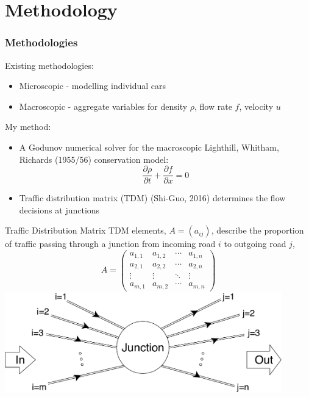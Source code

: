 \documentclass[12pt]{beamer}
\begin{document}
\section{Methodology}
	\begin{frame}
		\frametitle{Methodologies}
		Existing methodologies:
		\begin{itemize}
		    \item Microscopic - modelling individual cars
		    \item Macroscopic - aggregate variables for density $\rho$, flow rate $f$, velocity $u$
		\end{itemize}
		\vspace{0.5cm}
		My method:
		\begin{itemize}
			\item A Godunov numerical solver for the macroscopic Lighthill, Whitham, Richards (1955/56) conservation model: $$\frac{\partial\rho}{\partial t}+\frac{\partial f}{\partial x}=0$$
			\item Traffic distribution matrix (TDM) (Shi-Guo, 2016) determines the flow decisions at junctions
		\end{itemize}
	\end{frame}
	
	\begin{frame}{Traffic Distribution Matrix}
	TDM elements, $A=(a_{ij})$, describe the proportion of traffic passing through a junction from incoming road $i$ to outgoing road $j$,
	\begin{equation*}
    	A = 
    	\begin{pmatrix}
    	    a_{1,1} & a_{1,2} & \cdots & a_{1,n} \\
    	    a_{2,1} & a_{2,2} & \cdots & a_{2,n} \\
    	    \vdots  & \vdots  & \ddots & \vdots  \\
    	    a_{m,1} & a_{m,2} & \cdots & a_{m,n}
    	\end{pmatrix}
	\end{equation*}
	\centering
	\includegraphics[width=0.9\textwidth]{junction.pdf}
	\end{frame}
	
\end{document}
